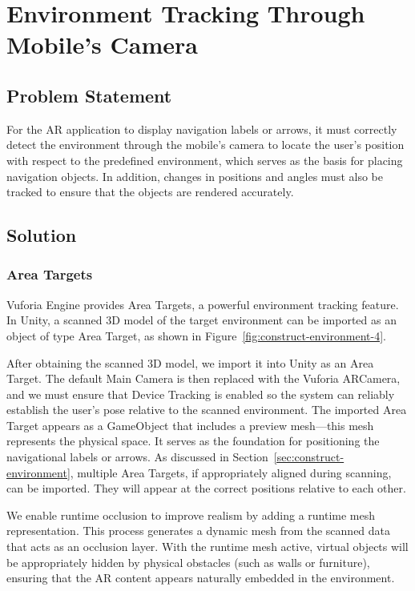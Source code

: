 \section{Environment Tracking Through Mobile's Camera}
\subsection{Problem Statement}
For the AR application to display navigation labels or arrows, it must correctly detect the environment through the mobile's camera to locate the user's position with respect to the predefined environment, which serves as the basis for placing navigation objects. In addition, changes in positions and angles must also be tracked to ensure that the objects are rendered accurately.

\subsection{Solution}

\subsubsection{Area Targets}
Vuforia Engine provides Area Targets, a powerful environment tracking feature. In Unity, a scanned 3D model of the target environment can be imported as an object of type Area Target, as shown in Figure~\ref{fig:construct-environment-4}. 

After obtaining the scanned 3D model, we import it into Unity as an Area Target. The default Main Camera is then replaced with the Vuforia ARCamera, and we must ensure that Device Tracking is enabled so the system can reliably establish the user’s pose relative to the scanned environment. The imported Area Target appears as a GameObject that includes a preview mesh—this mesh represents the physical space. It serves as the foundation for positioning the navigational labels or arrows. As discussed in Section~\ref{sec:construct-environment}, multiple Area Targets, if appropriately aligned during scanning, can be imported. They will appear at the correct positions relative to each other.

We enable runtime occlusion to improve realism by adding a runtime mesh representation. This process generates a dynamic mesh from the scanned data that acts as an occlusion layer. With the runtime mesh active, virtual objects will be appropriately hidden by physical obstacles (such as walls or furniture), ensuring that the AR content appears naturally embedded in the environment.

